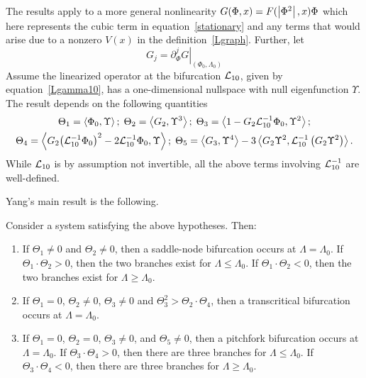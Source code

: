 \documentclass{article}
\numberwithin{equation}{section}
\numberwithin{figure}{section}
\begin{document}
The results apply to a more general nonlinearity $G(\Phi,x)=F(\left\lvert\Phi^2\right\rvert,x)\Phi$ which here represents the cubic term in equation~\eqref{stationary} and any terms that would arise due to a nonzero $V(x)$ in the definition~\eqref{Lgraph}. Further, let
\begin{equation}
G_j = {\left. \partial_\Phi^j G \right\rvert}_{(\Phi_0,\Lambda_0)}
\label{Gj}
\end{equation}
Assume the linearized operator at the bifurcation $\mathcal{L}_{10}$, given by equation~\eqref{Lgamma10}, has a one-dimensional nullspace with null eigenfunction $\Upsilon$. The result depends on the following quantities
\begin{equation}
\begin{gathered}
\Theta_1 = \left\langle \Phi_0, \Upsilon \right\rangle; \;
\Theta_2 = \left\langle G_2, \Upsilon^3 \right\rangle; \;
\Theta_3 = \left\langle 1-G_2 \mathcal{L}_{10}^{-1}\Phi_0, \Upsilon^2 \right\rangle; \\
\Theta_4 = \left\langle G_2{\left( \mathcal{L}_{10}^{-1}\Phi_0 \right)}^2 -2 \mathcal{L}_{10}^{-1}\Phi_0, \Upsilon \right\rangle; \;
\Theta_5 = \left\langle G_3, \Upsilon^4 \right\rangle - 3 \left\langle G_2\Upsilon^2, \mathcal{L}_{10}^{-1}\left(G_2 \Upsilon^2\right) \right\rangle.
\end{gathered}
\label{Thetas}
\end{equation}
While $\mathcal{L}_{10}$ is by assumption not invertible, all the above terms involving $\mathcal{L}_{10}^{-1}$ are well-defined.

Yang's main result is the following.
\begin{thm}
\label{YangTheorem}
Consider a system satisfying the above hypotheses. Then: 
\begin{enumerate}
\item
If $\Theta_1 \neq 0$ and $\Theta_2 \neq 0$, then a saddle-node bifurcation occurs at $\Lambda=\Lambda_0$. If $\Theta_1 \cdot \Theta_2 >0$, then the two branches exist for $\Lambda \le \Lambda_0$. If $\Theta_1 \cdot \Theta_2 < 0$, then the two branches exist for $\Lambda \ge \Lambda_0$. 
%
\item
If $\Theta_1 = 0$, $\Theta_2 \neq 0$, $\Theta_3 \neq 0 $ and $\Theta_3^2 > \Theta_2 \cdot \Theta_4$, then a transcritical bifurcation occurs at $\Lambda=\Lambda_0$.
%
\item
If $\Theta_1 = 0$, $\Theta_2 = 0$, $\Theta_3 \neq 0$, and $\Theta_5 \neq 0$, then a pitchfork bifurcation occurs at $\Lambda= \Lambda_0$. If $\Theta_3 \cdot \Theta_4 >0$, then there are three branches  for $\Lambda \le \Lambda_0$.  If $\Theta_3 \cdot \Theta_4 < 0$, then there are three branches for $\Lambda \ge \Lambda_0$. 
%
\end{enumerate}
\end{thm}
\end{document}
